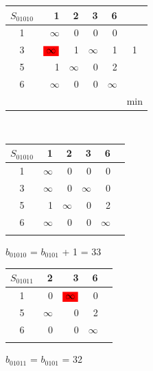 \documentclass[12pt]{article}
\begin{document}
\begin{flushleft}
 \begin{tabular}{c||rrrr||c}
$S_{01010}$ & 1 &2 & 3  & 6 & \\
\hline
\hline
1 & $\infty$ & 0 & 0   & 0 & \\
3 & $\colorbox{red}{$\infty$}$ & 1 & $\infty$   & 1 & 1\\
5 & 1 &  $\infty$ &  0 & 2 &\\
6 & $\infty$ & 0 & 0  & $\infty$ & \\
\hline
\hline
 & &   &  &   &min \\
\end{tabular}
$\qquad $ 
 \begin{tabular}{c||rrrr||c}
$S_{01010}$ & 1 &2 & 3  & 6 & \\
\hline
\hline
1 & $\infty$ & 0 & 0   & 0 & \\
3 & $\infty$ & 0 & $\infty$   & 0 & \\
5 & 1 &  $\infty$ &  0 & 2 &\\
6 & $\infty$ & 0 & 0  & $\infty$ & \\
\hline
\hline
 & &   &  &   & \\
\end{tabular}
\end{flushleft}

$b_{01010}$ = $b_{0101}$ + 1 = 33\\

\begin{flushleft}
 \begin{tabular}{c||rrr||c}
$S_{01011}$  &2 & 3  & 6 & \\
\hline
\hline
1 & 0 & $\colorbox{red}{$\infty$}$ & 0 & \\
5 & $\infty$ &  0 & 2 &\\
6 & 0 & 0  & $\infty$ & \\
\hline
\hline
 & &  &   & \\
\end{tabular}
\end{flushleft}

$b_{01011}$ = $b_{0101}$ = 32\\
\end{document}
